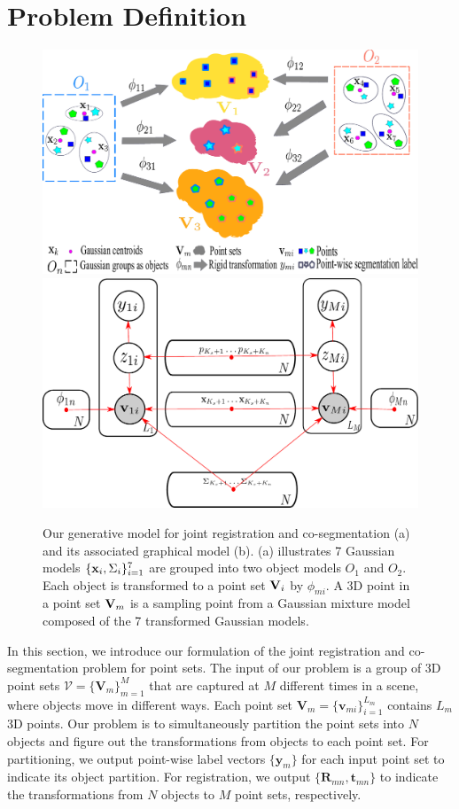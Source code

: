 \section{Problem Definition}
\label{sec:method}
\begin{figure}[htb]
	\centering
	\includegraphics[width=0.45\linewidth]{images/formulation}
	\hspace{0.1\linewidth}
	\includegraphics[width=0.40\linewidth]{images/formulation2}
	\caption{Our generative model for joint registration and co-segmentation (a) and its associated graphical model (b). (a) illustrates 7 Gaussian models $\{\mathbf{x}_i, \Sigma_i\}^{7}_{i=1}$ are grouped into two object models $O_1$ and $O_2$. Each object is transformed to a point set $\mathbf{V}_i$ by $\phi_{mi}$. A 3{D} point in a point set $\mathbf{V}_m$ is a sampling point from a Gaussian mixture model composed of the 7 transformed Gaussian models. } 
	\label{fig:formulation}
\end{figure}
In this section, we introduce our formulation of the joint registration and co-segmentation problem for point sets. 
The input of our problem is a group of 3D point sets  $\mathcal{V}=\{\mathbf{V}_m\}^{M}_{m=1}$ that are captured at $M$ different times in a scene, where objects move in different ways. Each point set $\mathbf{V}_m=\{\mathbf{v}_{mi}\}^{L_m}_{i=1}$ contains $L_m$ 3D points. Our problem is to simultaneously partition the point sets into $N$ objects and figure out the transformations from objects to each point set. For partitioning, we output point-wise label vectors $\{\mathbf{y}_m\}$ for each input point set to indicate its object partition. For registration, we output $\{\mathbf{R}_{mn},\mathbf{t}_{mn}\}$ to indicate the transformations from $N$ objects to $M$ point sets, respectively.
